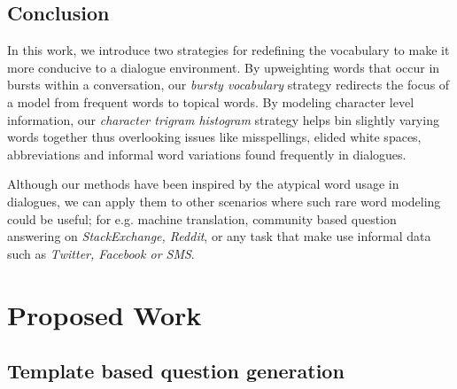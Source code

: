 \documentclass[11pt]{report}
\begin{document}
\section{Conclusion}

In this work, we introduce two strategies for redefining the vocabulary to make it more conducive to a dialogue environment. By upweighting words that occur in bursts within a conversation, our \textit{bursty vocabulary} strategy redirects the focus of a model from frequent words to topical words. By modeling character level information, our \textit{character trigram histogram} strategy helps bin slightly varying words together thus overlooking issues like misspellings, elided white spaces, abbreviations and informal word variations found frequently in dialogues. 

Although our methods have been inspired by the atypical word usage in dialogues, we can apply them to other scenarios where such rare word modeling could be useful; for e.g. machine translation, community based question answering on \textit{StackExchange, Reddit}, or any task that make use informal data such as \textit{Twitter, Facebook or SMS}.

\newpage

\chapter{Proposed Work}

\section{Template based question generation}
\end{document}
